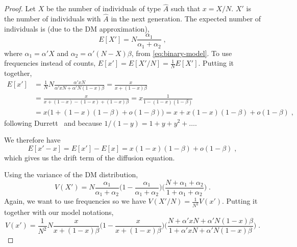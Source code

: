 \documentclass[12pt]{extarticle}
\begin{document}
\begin{appendices}
\begin{proof}
Let $X$ be the number of individuals of type $\hat{A}$ such that $x=X/N$. $X'$ is the number of individuals with $\hat{A}$ in the next generation.
The expected number of individuals is (due to the DM approximation),
\begin{equation}
E[X'] = N  \frac{\alpha_1}{\alpha_1+\alpha_2} \;,
\end{equation}
where $\alpha_1 = \alpha' X$ and $\alpha_2 = \alpha'(N-X)\beta$, from  \cref{eq:binary-model}.
To use frequencies instead of counts, $E[x'] = E[X'/N] = \frac{1}{N}E[X']$.
Putting it together,
\begin{equation}
\begin{split}
E[x'] &= \frac{1}{N}N\frac{\alpha' xN}{\alpha' xN + \alpha' N (1-x)\beta}
	  = \frac{x}{x + (1-x)\beta} \\
	  &= \frac{x}{x + (1-x) -(1-x) + (1-x)\beta}
	  = x \frac{1}{1 -(1-x)(1-\beta)}  \\
	  &= x \big(1 + (1-x)(1-\beta) + o(1-\beta)\big)
	  = x + x(1-x)(1-\beta) + o(1-\beta) \;, 
\end{split}
\end{equation}
following Durrett~\citep[p.~253, ch~7.2]{durret} and because $1/(1-y)=1+y+y^2+\ldots$.

{We} therefore have
\begin{equation}\label{eq:expec_freq}
E[x'-x] = E[x'] - E[x] = x(1-x)(1-\beta) + o(1-\beta) \;,
\end{equation}
which gives us the drift term of the diffusion equation.

Using the variance of the DM distribution,
\begin{equation}
V(X') = N\frac{\alpha_1}{\alpha_1+\alpha_2}
\Big(1-\frac{\alpha_1}{\alpha_1+\alpha_2}\Big)
\Big(\frac{N + \alpha_1+\alpha_2}{1+\alpha_1+\alpha_2}\Big) \;.
\end{equation}
Again, we want to use frequencies so we have $V(X'/N) = \frac{1}{N^2}V(x')$.
Putting it together with our model notations,
\begin{equation}
V(x') = \frac{1}{N^2}N\frac{x}{x+(1-x)\beta}\Big(1-\frac{x}{x+(1-x)\beta}\Big)
\Big(\frac{N + \alpha' xN + \alpha' N(1-x)\beta}{1 + \alpha' xN + \alpha' N(1-x)\beta}\Big) \;.
\end{equation}


\end{proof}
\end{appendices}
\end{document}
